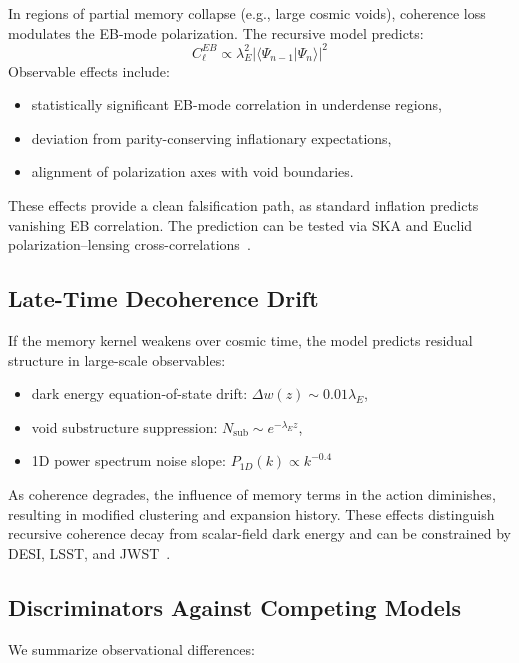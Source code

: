 In regions of partial memory collapse (e.g., large cosmic voids), coherence loss modulates the EB-mode polarization. The recursive model predicts:
\[
C_\ell^{EB} \propto \lambda_E^2 |\langle \Psi_{n-1} | \Psi_n \rangle|^2
\]
Observable effects include:
\begin{itemize}
    \item statistically significant EB-mode correlation in underdense regions,
    \item deviation from parity-conserving inflationary expectations,
    \item alignment of polarization axes with void boundaries.
\end{itemize}
These effects provide a clean falsification path, as standard inflation predicts vanishing EB correlation. The prediction can be tested via SKA and Euclid polarization–lensing cross-correlations~\cite{laureijs2011euclid, dewdney2009ska}.

\subsection{Late-Time Decoherence Drift}

If the memory kernel weakens over cosmic time, the model predicts residual structure in large-scale observables:
\begin{itemize}
    \item dark energy equation-of-state drift: \( \Delta w(z) \sim 0.01 \lambda_E \),
    \item void substructure suppression: \( N_{\text{sub}} \sim e^{-\lambda_E z} \),
    \item 1D power spectrum noise slope: \( P_{1D}(k) \propto k^{-0.4} \)
\end{itemize}
As coherence degrades, the influence of memory terms in the action diminishes, resulting in modified clustering and expansion history. These effects distinguish recursive coherence decay from scalar-field dark energy and can be constrained by DESI, LSST, and JWST~\cite{ivezic2019lsst, desi2016experiment}.

\subsection{Discriminators Against Competing Models}

We summarize observational differences:

